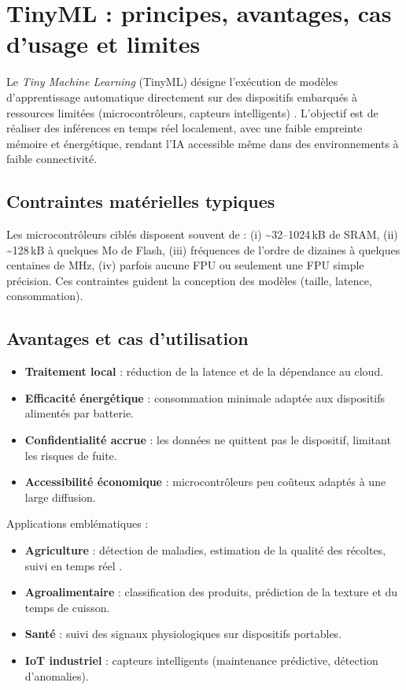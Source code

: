 \section{TinyML : principes, avantages, cas d’usage et limites}
Le \textit{Tiny Machine Learning} (TinyML) désigne l’exécution de modèles d’apprentissage automatique directement sur des dispositifs embarqués à ressources limitées (microcontrôleurs, capteurs intelligents) \cite{banbury2021}. L’objectif est de réaliser des inférences en temps réel localement, avec une faible empreinte mémoire et énergétique, rendant l’IA accessible même dans des environnements à faible connectivité.

\subsection{Contraintes matérielles typiques}
Les microcontrôleurs ciblés disposent souvent de : (i) \textasciitilde32–1024\,kB de SRAM, (ii) \textasciitilde128\,kB à quelques Mo de Flash, (iii) fréquences de l’ordre de dizaines à quelques centaines de MHz, (iv) parfois aucune FPU ou seulement une FPU simple précision. Ces contraintes guident la conception des modèles (taille, latence, consommation).

\subsection{Avantages et cas d’utilisation}
\begin{itemize}
    \item \textbf{Traitement local} : réduction de la latence et de la dépendance au cloud.
    \item \textbf{Efficacité énergétique} : consommation minimale adaptée aux dispositifs alimentés par batterie.
    \item \textbf{Confidentialité accrue} : les données ne quittent pas le dispositif, limitant les risques de fuite.
    \item \textbf{Accessibilité économique} : microcontrôleurs peu coûteux adaptés à une large diffusion.
\end{itemize}
Applications emblématiques :
\begin{itemize}
    \item \textbf{Agriculture} : détection de maladies, estimation de la qualité des récoltes, suivi en temps réel \cite{moeketsi2025, kimutaiforster2024}.
    \item \textbf{Agroalimentaire} : classification des produits, prédiction de la texture et du temps de cuisson.
    \item \textbf{Santé} : suivi des signaux physiologiques sur dispositifs portables.
    \item \textbf{IoT industriel} : capteurs intelligents (maintenance prédictive, détection d’anomalies).
\end{itemize}

